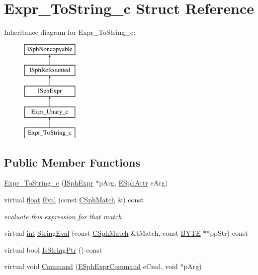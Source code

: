 \hypertarget{structExpr__ToString__c}{\section{Expr\-\_\-\-To\-String\-\_\-c Struct Reference}
\label{structExpr__ToString__c}
}
Inheritance diagram for Expr\-\_\-\-To\-String\-\_\-c\-:\begin{figure}[H]
\begin{center}
\leavevmode
\includegraphics[height=5.000000cm]{structExpr__ToString__c}
\end{center}
\end{figure}
\subsection*{Public Member Functions}
\begin{DoxyCompactItemize}
\item 
\hyperlink{structExpr__ToString__c_a068394d3642cdff2f1459d41e831053d}{Expr\-\_\-\-To\-String\-\_\-c} (\hyperlink{structISphExpr}{I\-Sph\-Expr} $\ast$p\-Arg, \hyperlink{sphinxexpr_8h_aa883df0db2e4468a107fdd2d2ae625a3}{E\-Sph\-Attr} e\-Arg)
\item 
virtual \hyperlink{sphinxexpr_8cpp_a0e0d0739f7035f18f949c2db2c6759ec}{float} \hyperlink{structExpr__ToString__c_aa050af5c426c788ecdc9970efbf7b276}{Eval} (const \hyperlink{classCSphMatch}{C\-Sph\-Match} \&) const 
\begin{DoxyCompactList}\small\item\em evaluate this expression for that match \end{DoxyCompactList}\item 
virtual \hyperlink{sphinxexpr_8cpp_a4a26e8f9cb8b736e0c4cbf4d16de985e}{int} \hyperlink{structExpr__ToString__c_a9b374d224e6cbed073bdfe617c1fb968}{String\-Eval} (const \hyperlink{classCSphMatch}{C\-Sph\-Match} \&t\-Match, const \hyperlink{sphinxstd_8h_a4ae1dab0fb4b072a66584546209e7d58}{B\-Y\-T\-E} $\ast$$\ast$pp\-Str) const 
\item 
virtual bool \hyperlink{structExpr__ToString__c_adda8a62f38e9a8e8bffed8792ca1f9cc}{Is\-String\-Ptr} () const 
\item 
virtual void \hyperlink{structExpr__ToString__c_aa63a032e4a810790af2018d826a1b6db}{Command} (\hyperlink{sphinxexpr_8h_a30be184fb07bd80c271360fc6094c818}{E\-Sph\-Expr\-Command} e\-Cmd, void $\ast$p\-Arg)
\end{DoxyCompactItemize}
